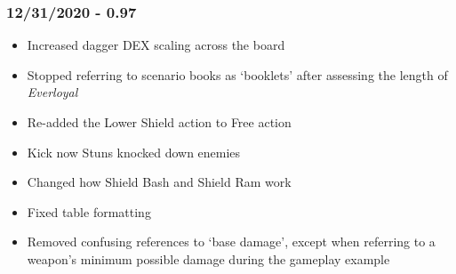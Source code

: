 \documentclass[12pt]{article}
\begin{document}
\begin{multicols*}{2}
\subsubsection*{12/31/2020 - 0.97}
\begin{itemize}
\item Increased dagger DEX scaling across the board
\item Stopped referring to scenario books as ‘booklets’ after assessing the length of \emph{Everloyal}
\item Re-added the Lower Shield action to Free action
\item Kick now Stuns knocked down enemies
\item Changed how Shield Bash and Shield Ram work
\item Fixed table formatting
\item Removed confusing references to ‘base damage’, except when referring to a weapon’s minimum possible damage during the gameplay example
\end{itemize}

\end{multicols*}
\end{document}

